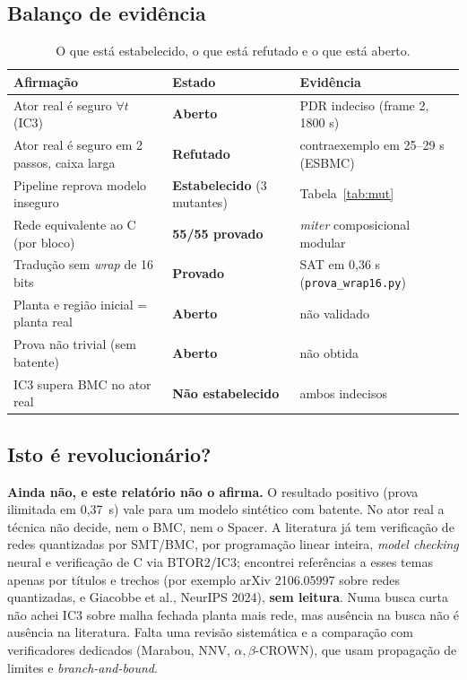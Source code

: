 \documentclass[12pt,openright,oneside,a4paper,chapter=TITLE,sumario=tradicional,english,brazil]{abntex2}
\begin{document}
\subsection{Balanço de evidência}

\begin{table}[htb]
\caption{O que está estabelecido, o que está refutado e o que está aberto.}\label{tab:balanco}
\centering
\begin{tabular}{p{6.0cm}|p{2.7cm}|p{4.2cm}}
\toprule
\textbf{Afirmação} & \textbf{Estado} & \textbf{Evidência} \\
\midrule
Ator real é seguro $\forall t$ (IC3) & \textbf{Aberto} & PDR indeciso (frame 2, 1800 s) \\
Ator real é seguro em 2 passos, caixa larga & \textbf{Refutado} & contraexemplo em 25--29 s (ESBMC) \\
Pipeline reprova modelo inseguro & \textbf{Estabelecido} (3 mutantes) & Tabela~\ref{tab:mut} \\
Rede equivalente ao C (por bloco) & \textbf{55/55 provado} & \emph{miter} composicional modular \\
Tradução sem \emph{wrap} de 16 bits & \textbf{Provado} & SAT em 0,36 s (\texttt{prova\_wrap16.py}) \\
Planta e região inicial = planta real & \textbf{Aberto} & não validado \\
Prova não trivial (sem batente) & \textbf{Aberto} & não obtida \\
IC3 supera BMC no ator real & \textbf{Não estabelecido} & ambos indecisos \\
\bottomrule
\end{tabular}
\end{table}

\subsection{Isto é revolucionário?}

\textbf{Ainda não, e este relatório não o afirma.} O resultado positivo (prova ilimitada em 0,37~s) vale para um modelo sintético com batente. No ator real a técnica não decide, nem o BMC, nem o Spacer. A literatura já tem verificação de redes quantizadas por SMT/BMC, por programação linear inteira, \emph{model checking} neural e verificação de C via BTOR2/IC3; encontrei referências a esses temas apenas por títulos e trechos (por exemplo arXiv 2106.05997 sobre redes quantizadas, e Giacobbe et al., NeurIPS 2024), \textbf{sem leitura}. Numa busca curta não achei IC3 sobre malha fechada planta mais rede, mas ausência na busca não é ausência na literatura. Falta uma revisão sistemática e a comparação com verificadores dedicados (Marabou, NNV, $\alpha,\beta$-CROWN), que usam propagação de limites e \emph{branch-and-bound}.
\end{document}
